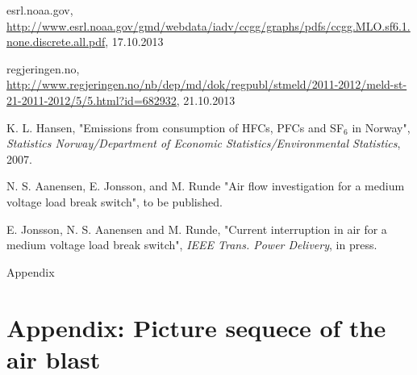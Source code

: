 \documentclass[10pt,b5paper,twoside]{article}
\begin{document}
\begin{thebibliography}{10}
 esrl.noaa.gov, \url{http://www.esrl.noaa.gov/gmd/webdata/iadv/ccgg/graphs/pdfs/ccgg.MLO.sf6.1.none.discrete.all.pdf}, 17.10.2013

 regjeringen.no, \url{http://www.regjeringen.no/nb/dep/md/dok/regpubl/stmeld/2011-2012/meld-st-21-2011-2012/5/5.html?id=682932}, 21.10.2013

 K. L. Hansen, "Emissions from consumption of HFCs, PFCs and SF$_6$ in Norway", \textit{Statistics Norway/Department of Economic Statistics/Environmental Statistics}, 2007.

 N. S. Aanensen, E. Jonsson, and M. Runde "Air flow investigation for a medium voltage load break switch", to be published.

 E. Jonsson, N. S. Aanensen and M. Runde, "Current interruption in air for a medium voltage load break switch", \textit{IEEE Trans. Power Delivery}, in press.

\end{thebibliography}

\cleardoublepage
\appendix
\vspace*{\fill}
\begingroup
\begin{center}
\huge Appendix
\end{center}
\endgroup
\vspace*{\fill}

\cleardoublepage

\section{Appendix: Picture sequece of the air blast} \label{app:SelfBlast}
\setcounter{figure}{0}
\makeatletter 
\renewcommand{\thefigure}{A.\@arabic\c@figure}
\makeatother
\end{document}
